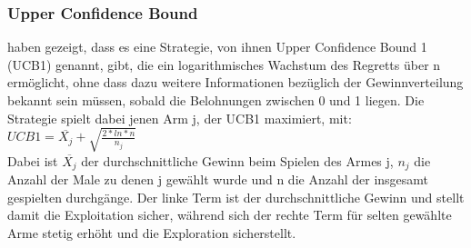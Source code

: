 \subsubsection{Upper Confidence Bound}
 haben gezeigt, dass es eine Strategie, von ihnen Upper Confidence Bound 1 (UCB1) genannt, gibt, die ein logarithmisches Wachstum des Regretts über n ermöglicht, ohne dass dazu weitere Informationen bezüglich der Gewinnverteilung bekannt sein müssen, sobald die Belohnungen zwischen 0 und 1 liegen. Die Strategie spielt dabei jenen Arm j, der UCB1 maximiert, mit:\\
$UCB1 = \overline{X_{j}}+\sqrt{\frac{2*ln*n}{n_{j}}}$\\
Dabei ist $\overline{X_{j}}$ der durchschnittliche Gewinn beim Spielen des Armes j, $n_{j}$ die Anzahl der Male zu denen j gewählt wurde und n die Anzahl der insgesamt gespielten durchgänge. Der linke Term ist der durchschnittliche Gewinn und stellt damit die Exploitation sicher, während sich der rechte Term für selten gewählte Arme stetig erhöht und die Exploration sicherstellt.